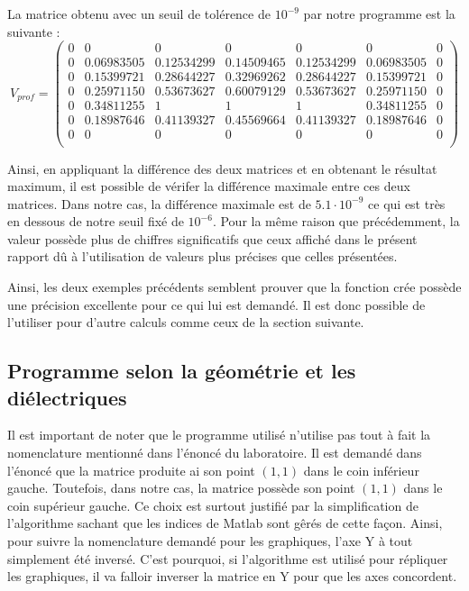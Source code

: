 La matrice obtenu avec un seuil de tolérence de $10^{-9}$ par notre programme est la suivante :
\[V_{prof}  = \left(\begin{array}{ccccccc}
0 & 0 			& 0 			& 0 			& 0 			& 0 			& 0 \\
0 & 0.06983505 	& 0.12534299 	& 0.14509465	& 0.12534299	& 0.06983505 	& 0 \\
0 & 0.15399721 	& 0.28644227 	& 0.32969262 	& 0.28644227 	& 0.15399721 	& 0 \\
0 & 0.25971150 	& 0.53673627 	& 0.60079129  	& 0.53673627 	& 0.25971150 	& 0 \\
0 & 0.34811255 	& 1				& 1				& 1			 	& 0.34811255 	& 0 \\
0 & 0.18987646 	& 0.41139327 	& 0.45569664	& 0.41139327 	& 0.18987646 	& 0 \\
0 & 0 			& 0 			& 0 			& 0 			& 0 			& 0 \\
\end{array} \right)\]

Ainsi, en appliquant la différence des deux matrices et en obtenant le résultat maximum, il est possible de vérifer la différence maximale entre ces deux matrices. Dans notre cas, la différence maximale est de $5.1 \cdot 10^{-9}$ ce qui est très en dessous de notre seuil fixé de $10^{-6}$. Pour la même raison que précédemment, la valeur possède plus de chiffres significatifs que ceux affiché dans le présent rapport dû à l'utilisation de valeurs plus précises que celles présentées.

Ainsi, les deux exemples précédents semblent prouver que la fonction crée possède une précision excellente pour ce qui lui est demandé. Il est donc possible de l'utiliser pour d'autre calculs comme ceux de la section suivante.

\subsection{Programme selon la géométrie et les diélectriques}
Il est important de noter que le programme utilisé n'utilise pas tout à fait la nomenclature mentionné dans l'énoncé du laboratoire. Il est demandé dans l'énoncé que la matrice produite ai son point $(1,1)$ dans le coin inférieur gauche. Toutefois, dans notre cas, la matrice possède son point $(1,1)$ dans le coin supérieur gauche. Ce choix est surtout justifié par la simplification de l'algorithme sachant que les indices de Matlab sont gêrés de cette façon. Ainsi, pour suivre la nomenclature demandé pour les graphiques, l'axe Y à tout simplement été inversé. C'est pourquoi, si l'algorithme est utilisé pour répliquer les graphiques, il va falloir inverser la matrice en Y pour que les axes concordent.

